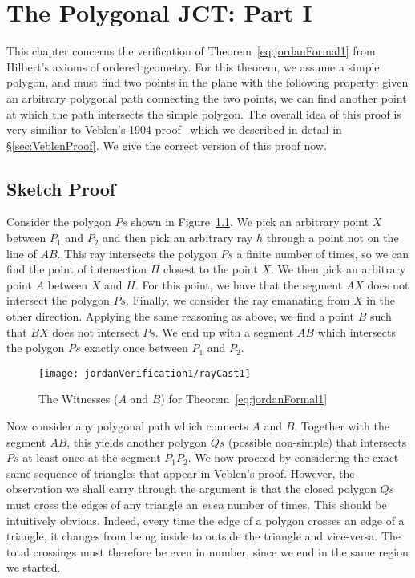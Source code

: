 \chapter{The Polygonal JCT: Part I}\label{chapter:JordanVerification1}
This chapter concerns the verification of Theorem~\ref{eq:jordanFormal1} from Hilbert's axioms of ordered geometry. For this theorem, we assume a simple polygon, and must find two points in the plane with the following property: given an arbitrary polygonal path connecting the two points, we can find another point at which the path intersects the simple polygon. The overall idea of this proof is very similiar to Veblen's 1904 proof~\cite{Veblenphd} which we described in detail in \S\ref{sec:VeblenProof}. We give the correct version of this proof now.

\section{Sketch Proof}\label{sec:ParityProofInformal}
Consider the polygon $Ps$ shown in Figure~\ref{fig:rayCast1}. We pick an arbitrary point $X$ between $P_1$ and $P_2$  and then pick an arbitrary ray $h$ through a point not on the line of $AB$. This ray intersects the polygon $Ps$ a finite number of times, so we can find the point of intersection $H$ closest to the point $X$. We then pick an arbitrary point $A$ between $X$ and $H$. For this point, we have that the segment $AX$ does not intersect the polygon $Ps$. Finally, we consider the ray emanating from $X$ in the other direction. Applying the same reasoning as above, we find a point $B$ such that $BX$ does not intersect $Ps$. We end up with a segment $AB$ which intersects the polygon $Ps$ exactly once between $P_1$ and $P_2$.

\begin{figure}
\centering\texttt{[image: jordanVerification1/rayCast1]}
\caption{The Witnesses ($A$ and $B$) for Theorem~\ref{eq:jordanFormal1}}
\label{fig:rayCast1}
\end{figure}

\newcommand{\insideoutsideclaim}{every time the edge of a polygon crosses an edge of a triangle, it changes from being inside to outside the triangle and vice-versa}

Now consider any polygonal path which connects $A$ and $B$. Together with the segment $AB$, this yields another polygon $Qs$ (possible non-simple) that intersects $Ps$ at least once at the segment $P_1P_2$. We now proceed by considering the exact same sequence of triangles that appear in Veblen's proof. However, the observation we shall carry through the argument is that the closed polygon $Qs$ must cross the edges of any triangle an \emph{even} number of times. This should be intuitively obvious. Indeed, \insideoutsideclaim. The total crossings must therefore be even in number, since we end in the same region we started.

